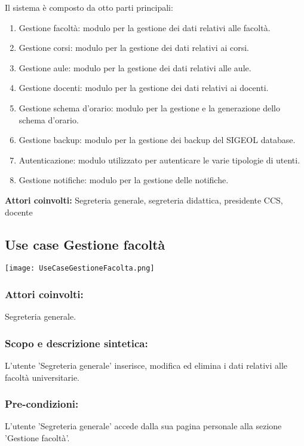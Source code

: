 \documentclass[11pt,a4paper]{article}
\begin{document}
Il sistema è composto da otto parti principali:
\begin{enumerate}
\item Gestione facoltà: modulo per la gestione dei dati relativi alle facoltà. 
\item Gestione corsi: modulo per la gestione dei dati relativi ai corsi.
\item Gestione aule: modulo per la gestione dei dati relativi alle aule.
\item Gestione docenti: modulo per la gestione dei dati relativi ai docenti.
\item Gestione schema d'orario: modulo per la gestione e la generazione dello schema d'orario.
\item Gestione backup: modulo per la gestione dei backup del SIGEOL database.
\item Autenticazione: modulo utilizzato per autenticare le varie tipologie di utenti.
\item Gestione notifiche: modulo per la gestione delle notifiche.
\end{enumerate}
\textbf{Attori coinvolti:}
Segreteria generale, segreteria didattica, presidente CCS, docente

\subsection{Use case Gestione facoltà}
\begin{center} 
 \texttt{[image: UseCaseGestioneFacolta.png]}
\end{center}

\subsubsection*{Attori coinvolti:}
Segreteria generale.

\subsubsection*{Scopo e descrizione sintetica:}
L'utente 'Segreteria generale' inserisce, modifica ed elimina i dati relativi alle facoltà universitarie.

\subsubsection*{Pre-condizioni:}
L'utente 'Segreteria generale' accede dalla sua pagina personale alla sezione 'Gestione facoltà'.
\end{document}
